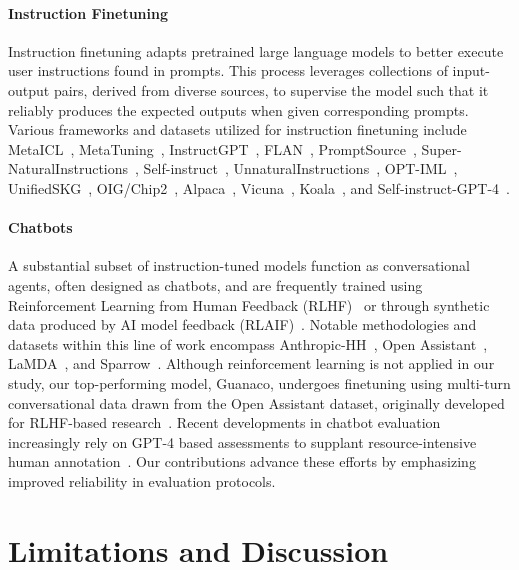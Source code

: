 \paragraph{Instruction Finetuning} Instruction finetuning adapts pretrained large language models to better execute user instructions found in prompts. This process leverages collections of input-output pairs, derived from diverse sources, to supervise the model such that it reliably produces the expected outputs when given corresponding prompts. Various frameworks and datasets utilized for instruction finetuning include MetaICL~\citep{min2021metaicl}, MetaTuning~\citep{zhong2021adapting}, InstructGPT~\citep{ouyang2022training}, FLAN~\citep{wei2021finetuned,chung2022scaling}, PromptSource~\citep{bach2022promptsource}, Super-NaturalInstructions~\citep{wang2022super,sanh2021multitask}, Self-instruct~\citep{wang2022self}, UnnaturalInstructions~\citep{honovich2022unnatural}, OPT-IML~\citep{iyer2022opt}, UnifiedSKG~\citep{xie2022unifiedskg}, OIG/Chip2~\citep{laion2023}, Alpaca~\citep{alpaca}, Vicuna~\citep{vicuna2023}, Koala~\citep{koala_blogpost_2023}, and Self-instruct-GPT-4~\citep{peng2023instruction}.

\paragraph{Chatbots} A substantial subset of instruction-tuned models function as conversational agents, often designed as chatbots, and are frequently trained using Reinforcement Learning from Human Feedback (RLHF)~\citep{christiano2017deep} or through synthetic data produced by AI model feedback (RLAIF)~\citep{bai2022constitutional}. Notable methodologies and datasets within this line of work encompass Anthropic-HH~\citep{askell2021general,bai2022training}, Open Assistant~\citep{kopf2023openassistant}, LaMDA~\citep{thoppilan2022lamda}, and Sparrow~\citep{glaese2022improving}. Although reinforcement learning is not applied in our study, our top-performing model, Guanaco, undergoes finetuning using multi-turn conversational data drawn from the Open Assistant dataset, originally developed for RLHF-based research~\citep{kopf2023openassistant}. Recent developments in chatbot evaluation increasingly rely on GPT-4 based assessments to supplant resource-intensive human annotation~\citep{vicuna2023,peng2023instruction}. Our contributions advance these efforts by emphasizing improved reliability in evaluation protocols.

\section{Limitations and Discussion}

